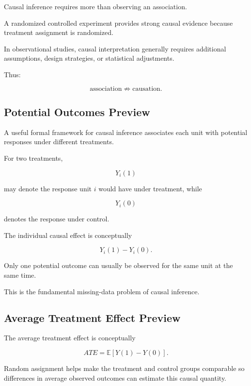 Causal inference requires more than observing an association.

A randomized controlled experiment provides strong causal evidence
because treatment assignment is randomized.

In observational studies, causal interpretation generally requires
additional assumptions, design strategies, or statistical adjustments.

Thus:

\[
\boxed{
\text{association}
\not\Rightarrow
\text{causation}.
}
\]

\subsection{Potential Outcomes Preview}
\label{subsec:potential-outcomes-preview}

A useful formal framework for causal inference associates each unit with
potential responses under different treatments.

For two treatments,

\[
Y_i(1)
\]

may denote the response unit \(i\) would have under treatment, while

\[
Y_i(0)
\]

denotes the response under control.

The individual causal effect is conceptually

\[
\boxed{
Y_i(1)-Y_i(0).
}
\]

Only one potential outcome can usually be observed for the same unit at
the same time.

This is the fundamental missing-data problem of causal inference.

\subsection{Average Treatment Effect Preview}
\label{subsec:average-treatment-effect-preview}

The average treatment effect is conceptually

\[
\boxed{
ATE
=
\mathbb{E}
[
Y(1)-Y(0)
].
}
\]

Random assignment helps make the treatment and control groups comparable
so differences in average observed outcomes can estimate this causal
quantity.

